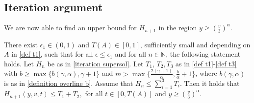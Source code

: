 \documentclass[11pt]{article}
\numberwithin{equation}{section}
\begin{document}
  \subsection{Iteration argument}\label{subsection region above}
  
We are now able to find an upper bound for $H_{n+1}$ in the region $y\geq (\frac{v}{3})^{\alpha}$. 
  \begin{prop}\label{supersol prop above region}
There exist $\epsilon_{1}\in(0,1)$ and $T(A)\in[0,1]$, sufficiently small and depending on $A$ in \eqref{def t1}, such that for all $\epsilon\leq \epsilon_{1}$ and for all $n\in\mathbb{N}$, the following statement holds. Let  $H_{n}$ be as in \eqref{iteration supersol}. Let $T_{1}$, $T_{2}, T_{3}$ as in \eqref{def t1}-\eqref{def t3} with  $b
\geq \max\{\overline{b}(\gamma,\alpha),\gamma+1\}$ and $m>\max\{\frac{2(\gamma+1)}{\alpha},\frac{b}{\alpha}+1\}$, where  $\overline{b}(\gamma,\alpha)$ is as in  \eqref{definition overline b}. Assume that $H_{n}\leq \sum_{i=1}^{3}T_{i}$. Then it holds that $H_{n+1}(y,v,t)\leq T_{1}+T_{2},$ for all $t\in[0,T(A)]$ and $y\geq (\frac{v}{3})^{\alpha}$.
\end{prop}
\end{document}
